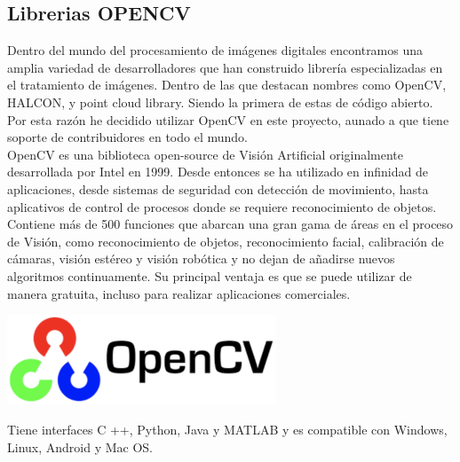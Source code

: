 \subsection{Librerias OPENCV}
Dentro del mundo del procesamiento de imágenes digitales encontramos una amplia variedad
de desarrolladores que han construido librería especializadas en el tratamiento de
imágenes. Dentro de las que destacan nombres como OpenCV, HALCON, y point cloud library.
Siendo la primera de estas de código abierto. Por esta razón he decidido utilizar
OpenCV en este proyecto, aunado a que tiene soporte de contribuidores en todo el mundo.\\
OpenCV es una biblioteca open-source de Visión Artificial originalmente desarrollada por
Intel en 1999. Desde entonces se ha utilizado en infinidad de aplicaciones, desde
sistemas de seguridad con detección de movimiento, hasta aplicativos de control de
procesos donde se requiere reconocimiento de objetos. Contiene más de 500 funciones
que abarcan una gran gama de áreas en el proceso de Visión, como reconocimiento de
objetos, reconocimiento facial, calibración de cámaras, visión estéreo y visión
robótica y no dejan de añadirse nuevos algoritmos continuamente. Su principal ventaja
es que se puede utilizar de manera gratuita, incluso para realizar aplicaciones
comerciales.\cite{WEB:Opencv}
\begin{center}
	\includegraphics[width=0.6\textwidth]{Contenido/Cuerpo/Capitulo2/Fig12.eps}
	\label{fig:MarcoTeorico:Fig19}
\end{center}
Tiene interfaces C ++, Python, Java y MATLAB y es compatible con Windows, Linux,
Android y Mac OS.

